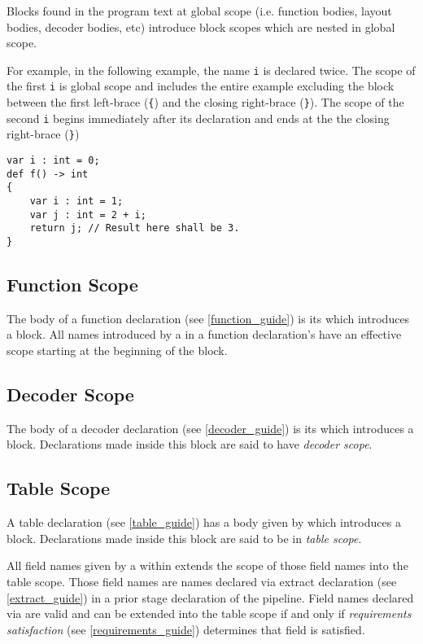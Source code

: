 Blocks found in the program text at global scope (i.e. function bodies, layout bodies, decoder bodies, etc) introduce block scopes which are nested in global scope.

For example, in the following example, the name \texttt{i} is declared twice. The scope of the first \texttt{i} is global scope and includes the entire example excluding the block between the first left-brace (\texttt{\{}) and the closing right-brace (\texttt{\}}). The scope of the second \texttt{i} begins immediately after its declaration and ends at the the closing right-brace (\texttt{\}})

\begin{minip}
\begin{lstlisting}
var i : int = 0;
def f() -> int
{
	var i : int = 1;
	var j : int = 2 + i;
	return j; // Result here shall be 3.
}
\end{lstlisting}
\end{minip}

\subsection{Function Scope} \label{function_scope}

The body of a function declaration (see \ref{function_guide}) is its  which introduces a block. All names introduced by a  in a function declaration's  have an effective scope starting at the beginning of the block.

\subsection{Decoder Scope} \label{decoder_scope}

The body of a decoder declaration (see \ref{decoder_guide}) is its  which introduces a block. Declarations made inside this block are said to have \textit{decoder scope}.

\subsection{Table Scope} \label{table_scope}

A table declaration (see \ref{table_guide}) has a body given by  which introduces a block. Declarations made inside this block are said to be in \textit{table scope}.

All field names given by a  within  extends the scope of those field names into the table scope. Those field names are names declared via extract declaration (see \ref{extract_guide}) in a prior stage declaration of the pipeline. Field names declared via  are valid and can be extended into the table scope if and only if \textit{requirements satisfaction} (see \ref{requirements_guide}) determines that field is satisfied.


